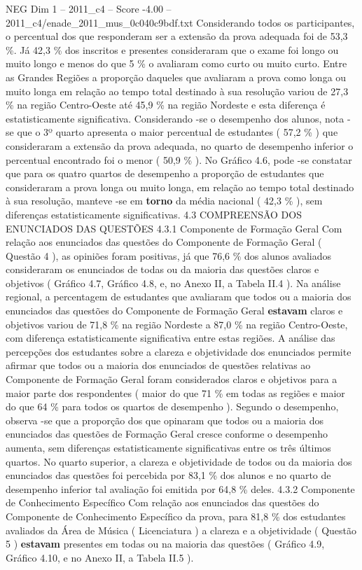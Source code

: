 \begin{textsample}{NEG Dim 1 – 2011\_c4 – Score -4.00 – 2011\_c4/enade\_2011\_mus\_0c040c9bdf.txt}
Considerando todos os participantes, o percentual dos que responderam ser a extensão da prova adequada foi de 53,3 \%.
Já 42,3 \% dos inscritos e presentes consideraram que o exame foi longo ou muito longo e menos do que 5 \% o avaliaram como curto ou muito curto.
Entre as Grandes Regiões a proporção daqueles que avaliaram a prova como longa ou muito longa em relação ao tempo total destinado à sua resolução variou de 27,3 \% na região Centro-Oeste até 45,9 \% na região Nordeste e esta diferença é estatisticamente significativa.
Considerando -se o desempenho dos alunos, nota -se que o 3º quarto apresenta o maior percentual de estudantes ( 57,2 \% ) que consideraram a extensão da prova adequada, no quarto de desempenho inferior o percentual encontrado foi o menor ( 50,9 \% ).
No Gráfico 4.6, pode -se constatar que para os quatro quartos de desempenho a proporção de estudantes que consideraram a prova longa ou muito longa, em relação ao tempo total destinado à sua resolução, manteve -se em \textbf{torno} da média nacional ( 42,3 \% ), sem diferenças estatisticamente significativas. 4.3 COMPREENSÃO DOS ENUNCIADOS DAS QUESTÕES 4.3.1 Componente de Formação Geral Com relação aos enunciados das questões do Componente de Formação Geral ( Questão 4 ), as opiniões foram positivas, já que 76,6 \% dos alunos avaliados consideraram os enunciados de todas ou da maioria das questões claros e objetivos ( Gráfico 4.7, Gráfico 4.8, e, no Anexo II, a Tabela II.4 ).
Na análise regional, a percentagem de estudantes que avaliaram que todos ou a maioria dos enunciados das questões do Componente de Formação Geral \textbf{estavam} claros e objetivos variou de 71,8 \% na região Nordeste a 87,0 \% na região Centro-Oeste, com diferença estatisticamente significativa entre estas regiões.
A análise das percepções dos estudantes sobre a clareza e objetividade dos enunciados permite afirmar que todos ou a maioria dos enunciados de questões relativas ao Componente de Formação Geral foram considerados claros e objetivos para a maior parte dos respondentes ( maior do que 71 \% em todas as regiões e maior do que 64 \% para todos os quartos de desempenho ).
Segundo o desempenho, observa -se que a proporção dos que opinaram que todos ou a maioria dos enunciados das questões de Formação Geral cresce conforme o desempenho aumenta, sem diferenças estatisticamente significativas entre os três últimos quartos.
No quarto superior, a clareza e objetividade de todos ou da maioria dos enunciados das questões foi percebida por 83,1 \% dos alunos e no quarto de desempenho inferior tal avaliação foi emitida por 64,8 \% deles. 4.3.2 Componente de Conhecimento Específico Com relação aos enunciados das questões do Componente de Conhecimento Específico da prova, para 81,8 \% dos estudantes avaliados da Área de Música ( Licenciatura ) a clareza e a objetividade ( Questão 5 ) \textbf{estavam} presentes em todas ou na maioria das questões ( Gráfico 4.9, Gráfico 4.10, e no Anexo II, a Tabela II.5 ).

\end{textsample}
